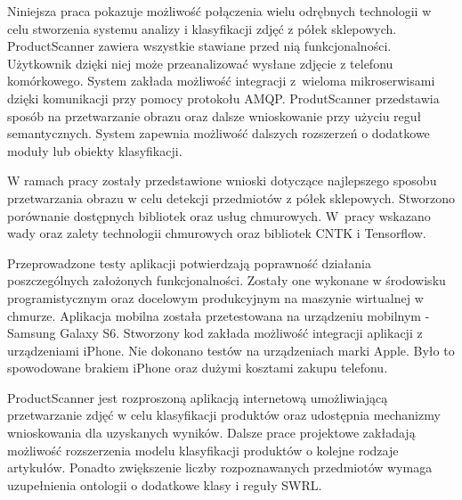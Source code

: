 Niniejsza praca pokazuje możliwość połączenia wielu odrębnych technologii w celu stworzenia systemu analizy i klasyfikacji zdjęć z półek sklepowych. ProductScanner zawiera wszystkie stawiane przed nią funkcjonalności. Użytkownik dzięki niej może przeanalizować wysłane zdjęcie z telefonu komórkowego. System zakłada możliwość integracji z~wieloma mikroserwisami dzięki komunikacji przy pomocy protokołu AMQP. ProdutScanner przedstawia sposób na przetwarzanie obrazu oraz dalsze wnioskowanie przy użyciu reguł semantycznych. System zapewnia możliwość dalszych rozszerzeń o dodatkowe moduły lub obiekty klasyfikacji. 

W ramach pracy zostały przedstawione wnioski dotyczące najlepszego sposobu przetwarzania obrazu w celu detekcji przedmiotów z półek sklepowych. Stworzono porównanie dostępnych bibliotek oraz usług chmurowych. W~pracy wskazano wady oraz zalety technologii chmurowych oraz bibliotek CNTK i Tensorflow. 

Przeprowadzone testy aplikacji potwierdzają poprawność działania poszczególnych założonych funkcjonalności. Zostały one wykonane w środowisku programistycznym oraz docelowym produkcyjnym na maszynie wirtualnej w chmurze. Aplikacja mobilna została przetestowana na urządzeniu mobilnym - Samsung Galaxy S6. Stworzony kod zakłada możliwość integracji aplikacji z urządzeniami iPhone. Nie dokonano testów na urządzeniach marki Apple. Było to spowodowane brakiem iPhone oraz dużymi kosztami zakupu telefonu.

ProductScanner jest rozproszoną aplikacją internetową umożliwiającą przetwarzanie zdjęć w celu klasyfikacji produktów oraz udostępnia mechanizmy wnioskowania dla uzyskanych wyników. Dalsze prace projektowe zakładają możliwość rozszerzenia modelu klasyfikacji produktów o kolejne rodzaje artykułów. Ponadto zwiększenie liczby rozpoznawanych przedmiotów wymaga uzupełnienia ontologii o dodatkowe klasy i reguły SWRL.